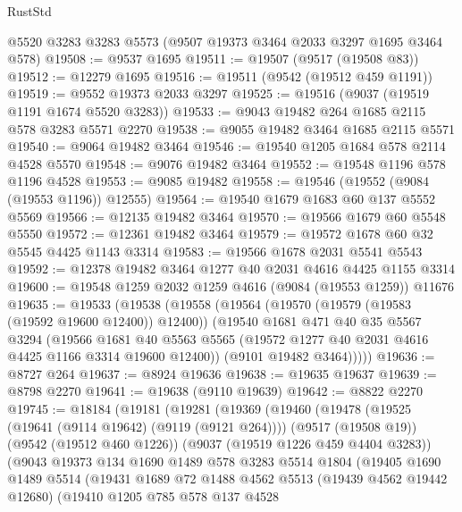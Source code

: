 \begin{lexlean}{RustStd}
\begin{coremodule}
    @5520
    @3283
    @3283
    @5573
    (@9507 @19373 @3464 @2033 @3297 @1695 @3464 @578)
@19508 := @9537 @1695
@19511 := @19507 (@9517 (@19508 @83))
@19512 := @12279 @1695
@19516 := @19511 (@9542 (@19512 @459 @1191))
@19519 := @9552 @19373 @2033 @3297
@19525 := @19516 (@9037 (@19519 @1191 @1674 @5520 @3283))
@19533 := @9043 @19482 @264 @1685 @2115 @578 @3283 @5571 @2270
@19538 := @9055 @19482 @3464 @1685 @2115 @5571
@19540 := @9064 @19482 @3464
@19546 := @19540 @1205 @1684 @578 @2114 @4528 @5570
@19548 := @9076 @19482 @3464
@19552 := @19548 @1196 @578 @1196 @4528
@19553 := @9085 @19482
@19558 := @19546 (@19552 (@9084 (@19553 @1196)) @12555)
@19564 := @19540 @1679 @1683 @60 @137 @5552 @5569
@19566 := @12135 @19482 @3464
@19570 := @19566 @1679 @60 @5548 @5550
@19572 := @12361 @19482 @3464
@19579 := @19572 @1678 @60 @32 @5545 @4425 @1143 @3314
@19583 := @19566 @1678 @2031 @5541 @5543
@19592 := @12378 @19482 @3464 @1277 @40 @2031 @4616 @4425 @1155 @3314
@19600 := @19548 @1259 @2032 @1259 @4616 (@9084 (@19553 @1259)) @11676
@19635 := @19533
    (@19538
      (@19558
        (@19564
          (@19570 (@19579 (@19583 (@19592 @19600 @12400)) @12400))
          (@19540
            @1681
            @471
            @40
            @35
            @5567
            @3294
            (@19566
              @1681
              @40
              @5563
              @5565
              (@19572 @1277 @40 @2031 @4616 @4425 @1166 @3314 @19600 @12400))
            (@9101 @19482 @3464)))))
@19636 := @8727 @264
@19637 := @8924 @19636
@19638 := @19635 @19637
@19639 := @8798 @2270
@19641 := @19638 (@9110 @19639)
@19642 := @8822 @2270
@19745 := @18184
    (@19181
      (@19281
        (@19369
          (@19460
            (@19478
              (@19525 (@19641 (@9114 @19642) (@9119 (@9121 @264))))
              (@9517 (@19508 @19))
              (@9542 (@19512 @460 @1226))
              (@9037 (@19519 @1226 @459 @4404 @3283))
              (@9043
                @19373
                @134
                @1690
                @1489
                @578
                @3283
                @5514
                @1804
                (@19405
                  @1690
                  @1489
                  @5514
                  (@19431
                    @1689
                    @72
                    @1488
                    @4562
                    @5513
                    (@19439 @4562 @19442 @12680)
                    (@19410
                      @1205
                      @785
                      @578
                      @137
                      @4528

\end{coremodule}
\end{lexlean}
